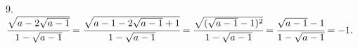 9. $\cfrac{\sqrt{a-2\sqrt{a-1}}}{1-\sqrt{a-1}}=\cfrac{\sqrt{a-1-2\sqrt{a-1}+1}}{1-\sqrt{a-1}}=\cfrac{\sqrt{(\sqrt{a-1}-1)^2}}{1-\sqrt{a-1}}=
\cfrac{\sqrt{a-1}-1}{1-\sqrt{a-1}}=-1.$\\
